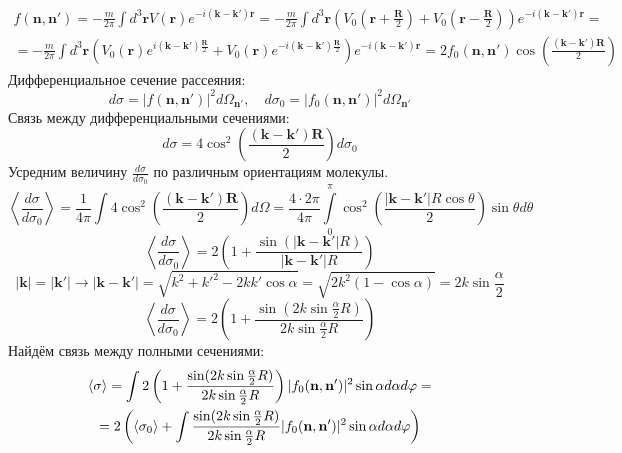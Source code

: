 \documentclass[12pt]{article}
\theoremstyle{definition}
\begin{document}
\begin{multline}
    f(\textbf{n},\textbf{n}')=-\frac{m}{2\pi}\int d^3\textbf{r}V(\textbf{r})e^{-i(\textbf{k}-\textbf{k}')\textbf{r}}=-\frac{m}{2\pi}\int d^3\textbf{r}\left(V_0\left(\textbf{r} + \frac{\textbf{R}}{2}\right) + V_0\left(\textbf{r}-\frac{\textbf{R}}{2}\right)\right)e^{-i(\textbf{k}-\textbf{k}')\textbf{r}}=\\=-\frac{m}{2\pi}\int d^3\textbf{r}\left(V_0(\textbf{r})e^{i(\textbf{k}-\textbf{k}')\frac{\textbf{R}}{2}} + V_0(\textbf{r})e^{-i(\textbf{k}-\textbf{k}')\frac{\textbf{R}}{2}}\right)e^{-i(\textbf{k}-\textbf{k}')\textbf{r}}=2f_0(\textbf{n},\textbf{n}')\cos\left(\frac{(\textbf{k}-\textbf{k}')\textbf{R}}{2}\right)
\end{multline}
Дифференциальное сечение рассеяния:
\begin{equation}
    d\sigma=|f(\textbf{n},\textbf{n}')|^2d\Omega_{\textbf{n}'},\quad d\sigma_0=|f_0(\textbf{n},\textbf{n}')|^2d\Omega_{\textbf{n}'}
\end{equation}
Связь между дифференциальными сечениями:
\begin{equation}
    \boxed{d\sigma=4\cos^2\left(\frac{(\textbf{k}-\textbf{k}')\textbf{R}}{2}\right)d\sigma_0}
\end{equation}
Усредним величину $\frac{d\sigma}{d\sigma_0}$ по различным ориентациям молекулы.
\begin{equation}
    \left<\frac{d\sigma}{d\sigma_0}\right>=\frac{1}{4\pi}\int 4\cos^2\left(\frac{(\textbf{k}-\textbf{k}')\textbf{R}}{2}\right) d\Omega=\frac{4\cdot2\pi}{4\pi}\int\limits_0^\pi\cos^2\left(\frac{|\textbf{k}-\textbf{k}'|R\cos\theta}{2}\right)\sin\theta d\theta
\end{equation}
\begin{equation}
    \left<\frac{d\sigma}{d\sigma_0}\right>=2\left(1+\frac{\sin(|\textbf{k}-\textbf{k}'|R)}{|\textbf{k}-\textbf{k}'|R}\right)
\end{equation}
\begin{equation}
    |\textbf{k}|=|\textbf{k}'|\rightarrow|\textbf{k}-\textbf{k}'|=\sqrt{k^2+k'^2-2kk'\cos\alpha}=\sqrt{2k^2(1-\cos\alpha)}=2k\sin\frac{\alpha}{2}
\end{equation}
\begin{equation}
    \boxed{\left<\frac{d\sigma}{d\sigma_0}\right>=2\left(1+\frac{\sin(2k\sin\frac{\alpha}{2}R)}{2k\sin\frac{\alpha}{2}R}\right)}
\end{equation}
Найдём связь между полными сечениями:
\begin{multline}
    \braket{\sigma}=\int2\left(1+\frac{\sin(2k\sin\frac{\alpha}{2}R)}{2k\sin\frac{\alpha}{2}R}\right)|f_0(\textbf{n},\textbf{n}')|^2\sin\alpha d\alpha d\varphi=\\=2\left(\braket{\sigma_0}+\int\frac{\sin(2k\sin\frac{\alpha}{2}R)}{2k\sin\frac{\alpha}{2}R}|f_0(\textbf{n},\textbf{n}')|^2\sin\alpha d\alpha d\varphi\right)
\end{multline}
\end{document}
